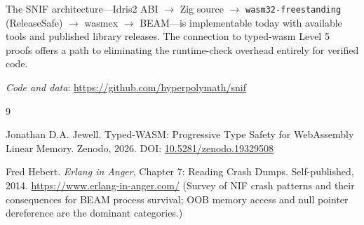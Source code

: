 \documentclass[11pt,a4paper]{article}
\begin{document}
The SNIF architecture---Idris2 ABI $\rightarrow$ Zig source
$\rightarrow$ \texttt{wasm32-freestanding} (ReleaseSafe) $\rightarrow$
wasmex $\rightarrow$ BEAM---is implementable today with available tools and
published library releases. The connection to typed-wasm Level 5 proofs offers
a path to eliminating the runtime-check overhead entirely for verified code.

\bigskip
\noindent\textit{Code and data}: \url{https://github.com/hyperpolymath/snif}

\begin{thebibliography}{9}

Jonathan D.A. Jewell.
\newblock Typed-WASM: Progressive Type Safety for WebAssembly Linear Memory.
\newblock Zenodo, 2026. DOI: \href{https://doi.org/10.5281/zenodo.19329508}{10.5281/zenodo.19329508}

Fred Hebert.
\newblock \textit{Erlang in Anger}, Chapter 7: Reading Crash Dumps.
\newblock Self-published, 2014. \url{https://www.erlang-in-anger.com/}
\newblock (Survey of NIF crash patterns and their consequences for BEAM
  process survival; OOB memory access and null pointer dereference are
  the dominant categories.)

\end{thebibliography}
\end{document}
